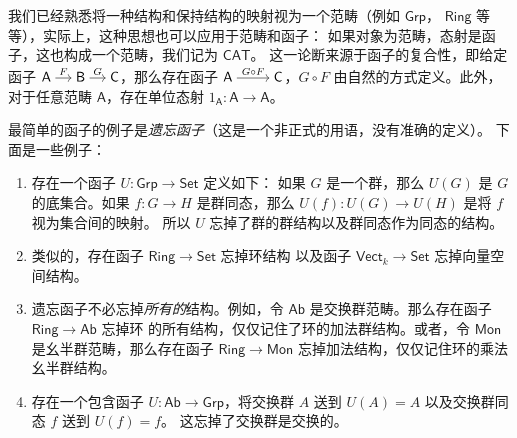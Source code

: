 \documentclass[fontset=none]{Notes}
\newenvironment{arr}[1][]{%
  $\begin{tikzcd}[cramped,#1]
}{\end{tikzcd}$}
\newcommand{\cat}[1]{\mathsf{#1}}
\begin{document}
\begin{remark}
  我们已经熟悉将一种结构和保持结构的映射视为一个范畴（例如 $\cat{Grp}$，
  $\cat{Ring}$ 等等），实际上，这种思想也可以应用于范畴和函子：
  如果对象为范畴，态射是函子，这也构成一个范畴，我们记为 $\cat{CAT}$。
  这一论断来源于函子的复合性，即给定函子
  \begin{arr}[sep=small]
    \cat{A}\arrow[r,"F"] & \cat{B}\arrow[r,"G"] & \cat{C}
  \end{arr}，那么存在函子
  \begin{arr}
    \cat{A}\arrow[r,"G\circ F"] & \cat{C}
  \end{arr}，$G\circ F$ 由自然的方式定义。此外，对于任意范畴
  $\cat A$，存在单位态射 $1_{\cat A}:\cat A\to \cat A$。
\end{remark}

\begin{example}
  最简单的函子的例子是\emph{遗忘函子}（这是一个非正式的用语，没有准确的定义）。
  下面是一些例子：
  \begin{enumerate}
    \item 存在一个函子 $U:\cat{Grp}\to\cat{Set}$ 定义如下：
    如果 $G$ 是一个群，那么 $U(G)$ 是 $G$ 的底集合。如果 $f:G\to H$
    是群同态，那么 $U(f):U(G)\to U(H)$ 是将 $f$ 视为集合间的映射。
    所以 $U$ 忘掉了群的群结构以及群同态作为同态的结构。
    \item 类似的，存在函子 $\cat{Ring}\to\cat{Set}$ 忘掉环结构
    以及函子 $\cat{Vect}_k\to\cat{Set}$ 忘掉向量空间结构。
    \item 遗忘函子不必忘掉\emph{所有的}结构。例如，令 $\cat{Ab}$
    是交换群范畴。那么存在函子 $\cat{Ring}\to\cat{Ab}$ 忘掉环
    的所有结构，仅仅记住了环的加法群结构。或者，令 $\cat{Mon}$
    是幺半群范畴，那么存在函子 $\cat{Ring}\to\cat{Mon}$
    忘掉加法结构，仅仅记住环的乘法幺半群结构。
    \item 存在一个包含函子 $U:\cat{Ab}\to\cat{Grp}$，将交换群
    $A$ 送到 $U(A)=A$ 以及交换群同态 $f$ 送到 $U(f)=f$。
    这忘掉了交换群是交换的。
  \end{enumerate}
\end{example}
\end{document}
